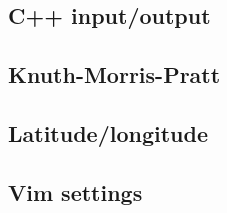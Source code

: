 \subsection{C++ input/output}
\raggedbottom
\hrulefill
\subsection{Knuth-Morris-Pratt}
\raggedbottom
\hrulefill
\subsection{Latitude/longitude}
\raggedbottom
\hrulefill
\subsection{Vim settings}
\raggedbottom
\hrulefill


